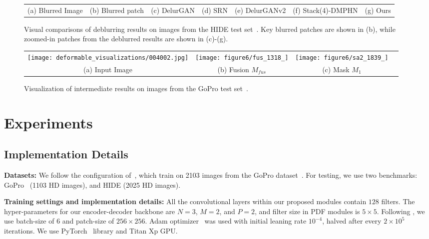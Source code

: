 \documentclass[10pt,twocolumn,letterpaper]{article}
\begin{document}
\begin{figure*}[htb]
\begin{tabular}{ccccccc}
								(a) Blurred Image&

				(b) Blurred patch& (c) DelurGAN & (d) SRN & (e) DelurGANv2 & (f) \tiny{Stack(4)-DMPHN} & (g) Ours  \\
	\end{tabular}
\caption{Visual comparisons of deblurring results on images from the HIDE test set~\cite{shen2019human}. Key blurred patches are shown in (b), while zoomed-in patches from the deblurred results are shown in (c)-(g).}\label{fig:visual_deblur_HIDE}
\end{figure*} 



\begin{figure}[htb] \label{fusion}
	\centering
\begin{tabular}{cccc}
		        \texttt{[image: deformable\_visualizations/004002.jpg]} & 
				\texttt{[image: figure6/fus\_1318\_]} & \texttt{[image: figure6/sa2\_1839\_]}		
				\\ 				
				(a) Input Image&
				(b) Fusion $M_{fus}$& (c) Mask $M_1$  \\
	\end{tabular}
\caption{Visualization of intermediate results on images from the GoPro test set~\cite{shen2019human}.} 
\label{fig:visualization1}
\end{figure} 


\section{Experiments} 
\subsection{Implementation Details}
\noindent \textbf{Datasets:} We follow the configuration of~\cite{zhang2019deep,kupyn2019deblurgan,tao2018scale,kupyn2017deblurgan,nah2017deep}, which train on 2103 images from the GoPro dataset~\cite{nah2017deep}. For testing, we use two benchmarks: GoPro~\cite{nah2017deep} (1103 HD images), and HIDE \cite{shen2019human} (2025 HD images).

\noindent\textbf{Training settings and implementation details:} 
All the convolutional layers within our proposed modules contain $128$ filters. The hyper-parameters for our encoder-decoder backbone are $N=3$, $M=2$, and $P=2$, and filter size in PDF modules is $5\times5$. Following \cite{zhang2019deep}, we use batch-size of $6$ and patch-size of $256\times256$. Adam optimizer~\cite{kingma2014adam} was used with initial leaning rate $10^{-4}$, halved after every $2\times10^{5}$ iterations. We use PyTorch~\cite{paszke2017automatic} library and Titan Xp GPU.
\end{document}

